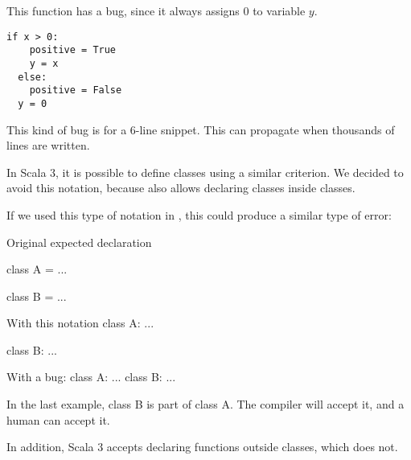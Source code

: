 This function has a bug, since it always assigns 0 to variable $y$.

\begin{lstlisting}[label={lst:snippetInPython2}]
  if x > 0:
    positive = True
    y = x
  else:
    positive = False
  y = 0
\end{lstlisting}

This kind of bug is for a 6-line snippet.
This can propagate when thousands of lines are written.

In Scala 3, it is possible to define classes using a similar criterion.
We decided to avoid this notation, because \Soda also allows declaring classes inside classes.

If we used this type of notation in \Soda, this could produce a similar type of error:

Original expected declaration

class A = {
    ...
}

class B = {
    ...
}

With this notation
class A:
...

class B:
...

With a bug:
class A:
...
class B:
...

In the last example, class B is part of class A.
The compiler will accept it, and a human can accept it.

In addition, Scala 3 accepts declaring functions outside classes, which \Soda does not.

